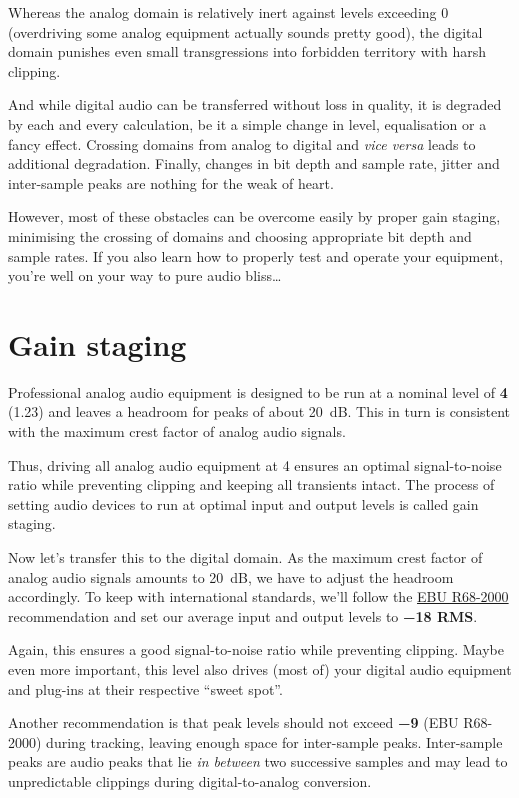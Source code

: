 Whereas the analog domain is relatively inert against levels exceeding
\SI{0}{\dBFS} (overdriving some analog equipment actually sounds
pretty good), the digital domain punishes even small transgressions
into forbidden territory with harsh clipping.

And while digital audio can be transferred without loss in quality, it
is degraded by each and every calculation, be it a simple change in
level, equalisation or a fancy effect.  Crossing domains from analog
to digital and \emph{vice versa} leads to additional degradation.
Finally, changes in bit depth and sample rate, jitter and inter-sample
peaks are nothing for the weak of heart.

However, most of these obstacles can be overcome easily by proper gain
staging, minimising the crossing of domains and choosing appropriate
bit depth and sample rates.  If you also learn how to properly test
and operate your equipment, you're well on your way to pure audio
bliss\dots

\section{Gain staging}
\label{sec:gain_staging}

Professional analog audio equipment is designed to be run at a nominal
level of \textbf{\SI[addsign=all]{+4}{\dBu}} (\SI{1.23}{\VRMS}) and
leaves a headroom for peaks of about \SI{20}{\dB}.  This in turn is
consistent with the maximum crest factor of analog audio signals.

Thus, driving all analog audio equipment at \SI[addsign=all]{+4}{\dBu}
ensures an optimal signal-to-noise ratio while preventing clipping and
keeping all transients intact.  The process of setting audio devices
to run at optimal input and output levels is called gain staging.

Now let's transfer this to the digital domain.  As the maximum crest
factor of analog audio signals amounts to \SI{20}{\dB}, we have to
adjust the headroom accordingly.  To keep with international
standards, we'll follow the
\href{http://tech.ebu.ch/publications/r068}{EBU R68-2000}
recommendation and set our average input and output levels to
\textbf{\SI{-18}{\dBFS} RMS}.

Again, this ensures a good signal-to-noise ratio while preventing
clipping.  Maybe even more important, this level also drives (most of)
your digital audio equipment and plug-ins at their respective ``sweet
spot''.

Another recommendation is that peak levels should not exceed
\textbf{\SI{-9}{\dBFS}} (EBU R68-2000) during tracking, leaving enough
space for inter-sample peaks.  Inter-sample peaks are audio peaks that
lie \emph{in between} two successive samples and may lead to
unpredictable clippings during digital-to-analog conversion.

